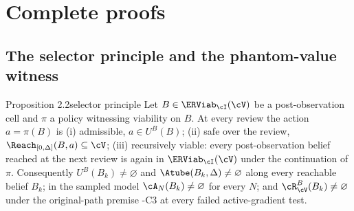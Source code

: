 \section{Complete proofs}\label{S:proofs}

\subsection{The selector principle and the phantom-value witness}\label{S:selector}

\begin{restated}{Proposition 2.2}{selector principle}
Let $B\in\ERViab_\cI(\cV)$ be a post-observation cell and $\pi$ a policy witnessing viability on $B$. At every review the action $a=\pi(B)$ is (i) admissible, $a\in U^B(B)$; (ii) safe over the review, $\Reach_{[0,\Delta]}(B,a)\subseteq\cV$; (iii) recursively viable: every post-observation belief reached at the next review is again in $\ERViab_\cI(\cV)$ under the continuation of $\pi$. Consequently $U^B(B_k)\neq\varnothing$ and $\Atube(B_k,\Delta)\neq\varnothing$ along every reachable belief $B_k$; in the sampled model $\cA_N(B_k)\neq\varnothing$ for every $N$; and $\cR^B_\cV(B_k)\neq\varnothing$ under the original-path premise \hyp{C3} at every failed active-gradient test.
\end{restated}

